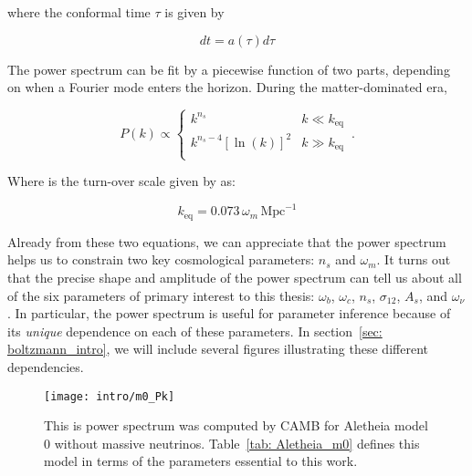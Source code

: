 where the conformal time $\tau$ is given by

\begin{equation}
dt = a(\tau) d \tau
\end{equation}

The power spectrum can be fit by a piecewise function of 
two parts, depending on when a Fourier mode enters the horizon.
During the matter-dominated era, 

\begin{equation}
\label{eq: n_s}
P(k) \propto 
\begin{cases}
      k^{n_s} & k \ll k_\text{eq} \\
      k^{n_s - 4} [\ln (k)]^2 & k \gg k_\text{eq} \\ 
    \end{cases}\,.
\end{equation}

Where is the turn-over scale given by \citet{FECS} as:

\begin{equation}
\label{eq: turnover}
k_\text{eq} = 0.073 \, \omega_m \, \mathrm{Mpc}^{-1}
\end{equation}


Already from these two equations, we can
appreciate that the power spectrum helps us to constrain two key cosmological
parameters: $n_s$ and $\omega_m$. It turns out that the precise shape and
amplitude of the power spectrum can tell us about all of the six
parameters of primary interest to this thesis:
$\omega_b$, $\omega_c$, $n_s$, $\sigma_{12}$, $A_s$, and $\omega_\nu$. 
In particular, the power spectrum is useful for parameter inference because of
its \textit{unique} dependence on each of these parameters. In 
section~\ref{sec: boltzmann_intro}, we will include several figures 
illustrating these different dependencies.


\begin{figure}[ht!]
  \centering
  \texttt{[image: intro/m0\_Pk]}
  \caption[Aletheia Model 0 Power Spectrum]{This is power spectrum was
  computed by CAMB for Aletheia model 0 without massive neutrinos.
  Table~\ref{tab: Aletheia_m0} defines this model in terms
  of the parameters essential to this work.}
  \label{fig: first_power_spectrum}
\end{figure}

